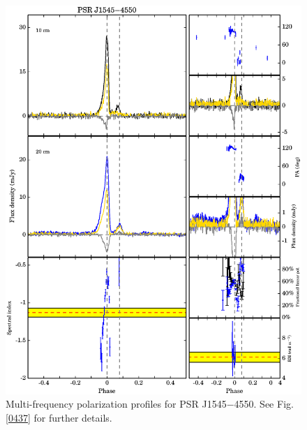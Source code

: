 \documentclass[useAMS,usenatbib]{mn2e}
\begin{document}
\begin{appendices}
\begin{figure}
\begin{center}
\includegraphics[width=6 in]{1545.ps}
\caption{Multi-frequency polarization profiles for PSR J1545$-$4550. 
See Fig. \ref{0437} for further details.}
\label{1545}
\end{center}
\end{figure}


\end{appendices}
\end{document}
